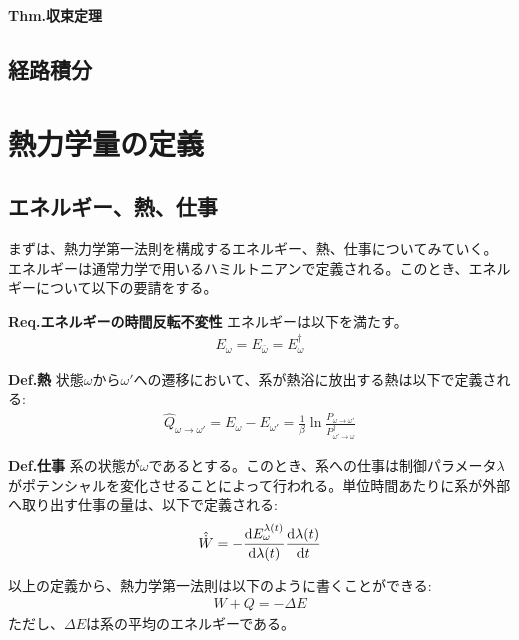 \documentclass[a4paper,11pt]{jsarticle}
\numberwithin{equation}{section}
\begin{document}
\begin{itembox}[l]{\textbf{Thm.収束定理}}

\end{itembox}





\subsection{経路積分}

\section{熱力学量の定義}
\subsection{エネルギー、熱、仕事}
まずは、熱力学第一法則を構成するエネルギー、熱、仕事についてみていく。\\
エネルギーは通常力学で用いるハミルトニアンで定義される。このとき、エネルギーについて以下の要請をする。\\
\begin{itembox}[l]{\textbf{Req.エネルギーの時間反転不変性}}
  エネルギーは以下を満たす。
  \begin{align}
    E_{\omega} = E_{\bar{\omega}} = E_{\omega}^{\dagger}
  \end{align}

\end{itembox}

\begin{itembox}[l]{\textbf{Def.熱}}
  状態$\omega$から$\omega'$への遷移において、系が熱浴に放出する熱は以下で定義される:
  \begin{align}
    \hat{Q}_{\omega \to \omega'} = E_{\omega} - E_{\omega'} = \frac{1}{\beta}\ln \frac{P_{\omega \to \omega'}}{P_{\omega' \to \omega}^{\dagger}}
  \end{align}
\end{itembox}

\begin{itembox}[l]{\textbf{Def.仕事}}
  系の状態が$\omega$であるとする。このとき、系への仕事は制御パラメータ$\lambda$がポテンシャルを変化させることによって行われる。単位時間あたりに系が外部へ取り出す仕事の量は、以下で定義される:
  \begin{align}
    \hat{\dot{W}} = -\dv{E^{\lambda(t)}_{\omega}}{\lambda(t)}\dv{\lambda(t)}{t}
  \end{align}
\end{itembox}
以上の定義から、熱力学第一法則は以下のように書くことができる:
\begin{align}
  W + Q = -\Delta E
\end{align}
ただし、$\Delta E$は系の平均のエネルギーである。\\
\end{document}
